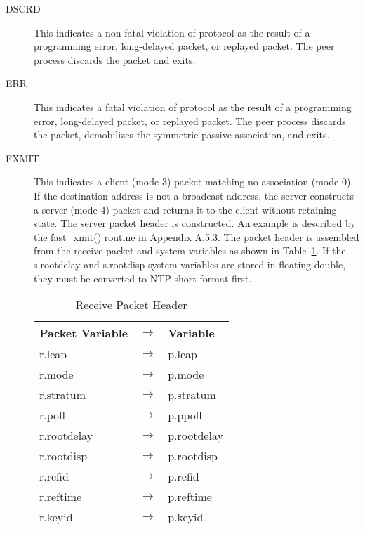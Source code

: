 \begin{description}

  \item[DSCRD] This indicates a non-fatal violation of protocol as the
    result of a programming error, long-delayed packet, or replayed
    packet. The peer process discards the packet and exits.

  \item[ERR] This indicates a fatal violation of protocol as the result of a
    programming error, long-delayed packet, or replayed packet. The peer
    process discards the packet, demobilizes the symmetric passive
    association, and exits.

  \item[FXMIT] This indicates a client (mode 3) packet matching no
    association (mode 0). If the destination address is not a broadcast
    address, the server constructs a server (mode 4) packet and returns
    it to the client without retaining state. The server packet header
    is constructed. An example is described by the fast\_xmit() routine
    in Appendix A.5.3. The packet header is assembled from the receive
    packet and system variables as shown in Table~\ref{receive_packet_header}. If the
    s.rootdelay and s.rootdisp system variables are stored in floating
    double, they must be converted to NTP short format first.

    \begin{table}[htb]
    \center
    \begin{tabular}{| l c l |}
    \hline
    Packet Variable & $ \rightarrow $ & Variable \\
    \hline
    \hline
    r.leap & $ \rightarrow $ & p.leap \\
    r.mode & $ \rightarrow $ & p.mode \\
    r.stratum & $ \rightarrow $ & p.stratum \\
    r.poll & $ \rightarrow $ & p.ppoll \\
    r.rootdelay & $ \rightarrow $ & p.rootdelay \\
    r.rootdisp & $ \rightarrow $ & p.rootdisp \\
    r.refid & $ \rightarrow $ & p.refid \\
    r.reftime & $ \rightarrow $ & p.reftime \\
    r.keyid & $ \rightarrow $ & p.keyid \\
    \hline
    \end{tabular}
    \caption{Receive Packet Header}
    \label{receive_packet_header}
    \end{table}


\end{description}
